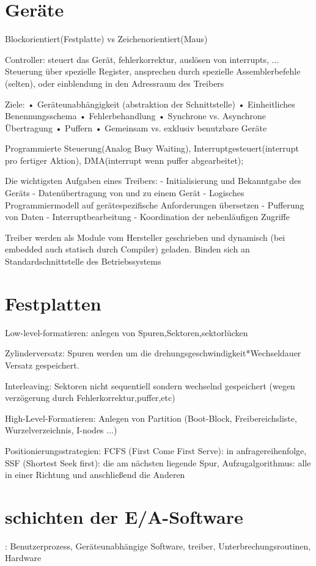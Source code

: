 \section*{Geräte}
Blockorientiert(Festplatte) vs Zeichenorientiert(Maus)

Controller: steuert das Gerät, fehlerkorrektur, auslösen von interrupts, ...
Steuerung über spezielle Register, ansprechen durch spezielle Assemblerbefehle (selten), oder einblendung in den Adressraum des Treibers

Ziele:
• Geräteunabhängigkeit (abstraktion der Schnittstelle)
• Einheitliches Benennungsschema
• Fehlerbehandlung
• Synchrone vs. Asynchrone Übertragung
• Puffern
• Gemeinsam vs. exklusiv benutzbare Geräte

Programmierte Steuerung(Analog Busy Waiting), Interruptgesteuert(interrupt pro fertiger Aktion), DMA(interrupt wenn puffer abgearbeitet);

Die wichtigsten Aufgaben eines Treibers:
- Initialisierung und Bekanntgabe des Geräts
- Datenübertragung von und zu einem Gerät
- Logisches Programmiermodell auf gerätespezifische
Anforderungen übersetzen
- Pufferung von Daten
- Interruptbearbeitung
- Koordination der nebenläufigen Zugriffe

Treiber werden als Module vom Hersteller geschrieben und dynamisch (bei embedded auch statisch durch Compiler) geladen. Binden sich an Standardschnittstelle des Betriebssystems

\section{Festplatten}
Low-level-formatieren: anlegen von Spuren,Sektoren,sektorlücken

Zylinderversatz: Spuren werden um die drehungsgeschwindigkeit*Wechseldauer Versatz gespeichert.

Interleaving: Sektoren nicht sequentiell sondern wechselnd gespeichert (wegen verzögerung durch Fehlerkorrektur,puffer,etc)

High-Level-Formatieren:
Anlegen von Partition (Boot-Block, Freibereichsliste, Wurzelverzeichnis, I-nodes ...)

Positionierungsstrategien: FCFS (First Come First Serve): in anfragereihenfolge,
SSF (Shortest Seek first): die am nächsten liegende Spur, Aufzugalgorithmus: alle in einer Richtung und anschließend die Anderen




\section{schichten der E/A-Software}: Benutzerprozess, Geräteunabhängige Software, treiber, Unterbrechungsroutinen, Hardware 